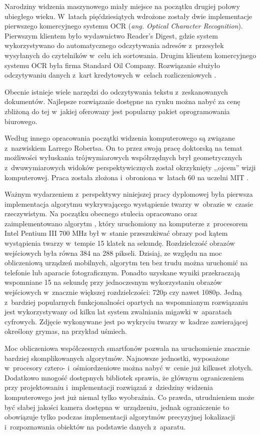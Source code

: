 Narodziny widzenia maszynowego miały
miejsce na początku drugiej połowy ubiegłego wieku.
W~latach pięćdziesiątych wdrożone zostały dwie implementacje 
pierwszego komercyjnego systemu OCR (\textit{ang. Optical Character 
Recognition}). Pierwszym klientem było wydawnictwo Reader's Digest,
gdzie system wykorzystywano do automatycznego odczytywania adresów
z~przesyłek wysyłanych do czytelników w~celu ich sortowania.
Drugim klientem komercyjnego systemu OCR 
była firma Standard Oil Company. Rozwiązanie
służyło odczytywaniu danych z~kart kredytowych w~celach 
rozliczeniowych \cite{WEB:ocrhistory}.

Obecnie istnieje wiele narzędzi do odczytywania tekstu z~zeskanowanych
dokumentów. Najlepsze rozwiązanie dostępne na rynku
można nabyć za cenę zbliżoną do tej w~jakiej oferowany jest
popularny pakiet oprogramowania biurowego.

Według innego opracowania \cite{web:huangcvevolution}
początki widzenia komputerowego są związane z~nazwiskiem Larrego
Robertsa. On to przez swoją pracę doktorską na temat możliwości
wyłuskania trójwymiarowych współrzędnych brył geometrycznych
z~dwuwymiarowych widoków perspektywicznych został okrzyknięty
,,ojcem'' wizji komputerowej. Praca została złożona i~obroniona 
w~latach 60 na uczelni MIT \cite{books/garland/Roberts63}.

Ważnym wydarzeniem z~perspektywy niniejszej pracy dyplomowej była
pierwsza implementacja algorytmu wykrywającego wystąpienie twarzy
w~obrazie w~czasie rzeczywistym.
Na początku obecnego stulecia opracowano oraz zaimplementowano algorytm
\cite{DBLP:conf/cvpr/ViolaJ01}, który uruchomiony na komputerze 
z~procesorem Intel Pentium III 700 MHz był w~stanie przeszukiwać obrazy
pod kątem wystąpienia twarzy w~tempie 15 klatek na sekundę.
Rozdzielczość obrazów wejściowych była równa 384 na 288 pikseli.
Dzisiaj, ze względu na moc obliczeniową urządzeń mobilnych, algorytm ten 
bez trudu można uruchomić
na telefonie lub aparacie fotograficznym. 
Ponadto uzyskane wyniki przekraczają wspomniane 15  na sekundę
przy jednoczesnym wykorzystaniu obrazów wejściowych w~znacznie
większej rozdzielczości: 720p czy nawet 1080p.
Jedną z~bardziej 
popularnych funkcjonalności opartych na wspomnianym rozwiązaniu 
jest wykorzystywany od kilku lat system zwalniania migawki w~aparatach
cyfrowych.
Zdjęcie wykonywane jest
po wykryciu twarzy w~kadrze zawierającej określony grymas, na przykład
uśmiech.

Moc obliczeniowa współczesnych smartfonów pozwala na uruchomienie
znacznie bardziej skomplikowanych algorytmów. Najnowsze jednostki,
wyposażone w~procesory cztero- i~ośmiordzeniowe można nabyć
w~cenie już kilkuset złotych. Dodatkowo mnogość dostępnych bibliotek 
sprawia, że głównym ograniczeniem przy projektowaniu i~implementacji
rozwiązań z~dziedziny widzenia komputerowego jest już niemal
tylko wyobraźnia. Co prawda, utrudnieniem może być słabej jakości
kamera dostępna w~urządzeniu, jednak ograniczenie to obowiązuje
tylko podczas implementacji algorytmów precyzyjnej lokalizacji
i~rozpoznawania obiektów na podstawie danych z~aparatu.

